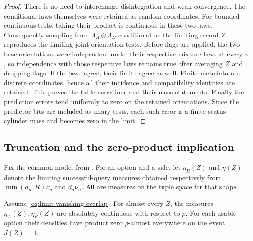 \begin{proof}
There is no need to interchange disintegration and weak convergence.
The conditional laws themselves were retained as random coordinates.
For bounded continuous tests, taking their product is continuous in
these two laws. Consequently sampling from
$\Lambda_A\otimes\Lambda_B$ conditional on the limiting record $Z$
reproduces the limiting joint orientation tests. Before flags are
applied, the two base orientations were independent under their
respective mixture laws at every $n$, so independence with those
respective laws remains true after averaging $Z$ and dropping flags.
If the laws agree, their limits agree as well. Finite metadata are discrete coordinates, hence all their
incidence and compatibility identities are retained. This proves the
table assertions and their mass statements. Finally the prediction
errors tend uniformly to zero on the retained orientations. Since the
predictor bits are included as unary tests, each such error is a finite
status-cylinder mass and becomes zero in the limit.
\end{proof}

\subsection{Truncation and the zero-product implication}

Fix the common model from . For an option and a
side, let $\eta_R(Z)$ and $\eta(Z)$ denote the limiting successful-query
measures obtained respectively from $\min(d_n,R)\nu_n$ and $d_n\nu_n$.
All are measures on the tuple space for that shape.

\begin{lemma}
\label{lem:limit-zero-product}
Assume \eqref{eq:limit-vanishing-overlap}. For almost every $Z$, the
measures $\eta_A(Z),\eta_B(Z)$ are absolutely continuous with respect
to $\rho$. For each usable option their densities have product zero
$\rho$-almost everywhere on the event $J(Z)=1$.
\end{lemma}

